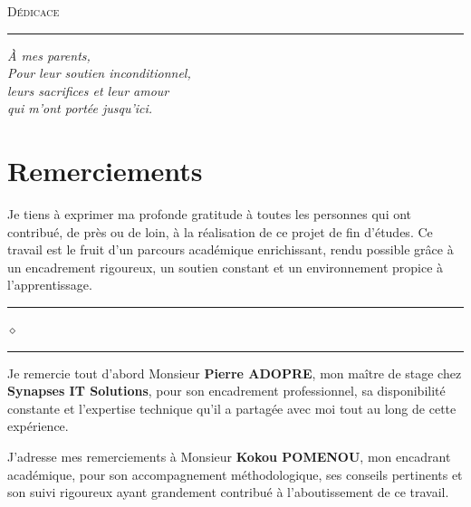 \documentclass[12pt,a4paper]{report}
\newcommand{\motcle}[1]{\textcolor{marine}{\textbf{#1}}}
\newcommand{\separateur}{%
    \vspace{0.5cm}%
    \begin{center}%
        \textcolor{grismoyen}{\rule{2cm}{0.4pt}}%
        \hspace{0.5em}%
        \textcolor{cuivre}{$\diamond$}%
        \hspace{0.5em}%
        \textcolor{grismoyen}{\rule{2cm}{0.4pt}}%
    \end{center}%
    \vspace{0.3cm}%
}
\begin{document}
\vspace*{7cm}
\begin{flushright}
    \begin{minipage}{0.65\textwidth}
        \raggedleft
        {\Large\textcolor{marine}{\textsc{Dédicace}}}
        
        \vspace{0.3cm}
        {\textcolor{cuivre}{\rule{3cm}{1pt}}}
        
        \vspace{0.8cm}
        
        {\large\textcolor{grisfonce}{\textit{%
            À mes parents,\\[0.4cm]
            Pour leur soutien inconditionnel,\\[0.2cm]
            leurs sacrifices et leur amour\\[0.2cm]
            qui m'ont portée jusqu'ici.%
        }}}
    \end{minipage}
\end{flushright}

\newpage
\chapter*{Remerciements}

Je tiens à exprimer ma profonde gratitude à toutes les personnes qui ont contribué, de près ou de loin, à la réalisation de ce projet de fin d'études. Ce travail est le fruit d'un parcours académique enrichissant, rendu possible grâce à un encadrement rigoureux, un soutien constant et un environnement propice à l'apprentissage.

\separateur

Je remercie tout d'abord Monsieur \motcle{Pierre ADOPRE}, mon maître de stage chez \motcle{Synapses IT Solutions}, pour son encadrement professionnel, sa disponibilité constante et l'expertise technique qu'il a partagée avec moi tout au long de cette expérience.
\vspace{0.3cm}

J'adresse mes remerciements à Monsieur \motcle{Kokou POMENOU}, mon encadrant académique, pour son accompagnement méthodologique, ses conseils pertinents et son suivi rigoureux ayant grandement contribué à l'aboutissement de ce travail.

\vspace{0.3cm}
\end{document}
